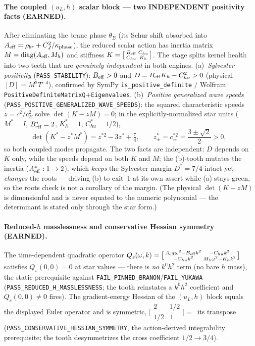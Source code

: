 \paragraph{The coupled \((u_L,h)\) scalar block --- two INDEPENDENT positivity facts (EARNED).}
After eliminating the brane phase \(\theta_B\) (its Schur shift absorbed into
\(A_{\rm eff}=\rho_{br}+C_J^2/\kappa_{\rm phase}\)), the reduced scalar action has
inertia matrix \(M=\mathrm{diag}(A_{\rm eff},M_h)\) and stiffness
\(K=\bigl[\begin{smallmatrix}B_{\rm eff}&C_{hu}\\C_{hu}&K_h\end{smallmatrix}\bigr]\).
The stage splits kernel health into two teeth that are \emph{genuinely
independent} in both engines. (a)~\emph{Sylvester positivity}
(\texttt{PASS\_STABILITY}): \(B_{\rm eff}>0\) and \(D=B_{\rm eff}K_h-C_{hu}^2>0\)
(physical \([D]=M^2T^{-4}\)), confirmed by SymPy \texttt{is\_positive\_definite}
/ Wolfram \texttt{PositiveDefiniteMatrixQ}+\texttt{Eigenvalues}. (b)~\emph{Positive
generalized wave speeds} (\texttt{PASS\_POSITIVE\_GENERALIZED\_WAVE\_SPEEDS}): the
squared characteristic speeds \(z=c^2/c_E^2\) solve \(\det(K-zM)=0\); in the
explicitly-normalized star units (\(M^*=I\), \(B_{\rm eff}^*=2\), \(K_h^*=1\),
\(C_{hu}^*=1/2\)),
\[
  \det(K^*-z^*M^*)=z^{*2}-3z^*+\tfrac74,\qquad
  z^*_\pm=c^{*2}_\pm=\frac{3\pm\sqrt2}{2}>0,
\]
so both coupled modes propagate. The two facts are independent: \(D\) depends on
\(K\) only, while the speeds depend on both \(K\) and \(M\); the (b)-tooth
mutates the inertia (\(A_{\rm eff}^*:1\to2\)), which \emph{keeps} the Sylvester
margin \(D^*=7/4\) intact yet \emph{changes} the roots --- driving (b) to exit~1
at its own assert while (a) stays green, so the roots check is not a corollary of
the margin. (The physical \(\det(K-zM)\) is dimensionful and is never equated to
the numeric polynomial --- the determinant is stated only through the star form.)

\paragraph{Reduced-\(h\) masslessness and conservative Hessian symmetry (EARNED).}
The time-dependent quadratic operator
\(Q_s(\omega,k)=\bigl[\begin{smallmatrix}A_{\rm eff}\omega^2-B_{\rm eff}k^2 & -C_{hu}k^2\\ -C_{hu}k^2 & M_h\omega^2-K_h k^2\end{smallmatrix}\bigr]\)
satisfies \(Q_s(0,0)=0\) at star values --- there is \emph{no} \(k^0h^2\) term
(no bare \(h\) mass), the static prerequisite against
\texttt{FAIL\_PINNED\_BRANON}/\texttt{FAIL\_YUKAWA}
(\texttt{PASS\_REDUCED\_H\_MASSLESSNESS}; the tooth reinstates a \(k^0h^2\)
coefficient and \(Q_s(0,0)\ne0\) fires). The gradient-energy Hessian of the
\((u_L,h)\) block equals the displayed Euler operator and is symmetric,
\(\bigl[\begin{smallmatrix}2&1/2\\1/2&1\end{smallmatrix}\bigr]=\)~its transpose
(\texttt{PASS\_CONSERVATIVE\_HESSIAN\_SYMMETRY}, the action-derived integrability
prerequisite; the tooth desymmetrizes the cross coefficient
\(1/2\to3/4\)).


